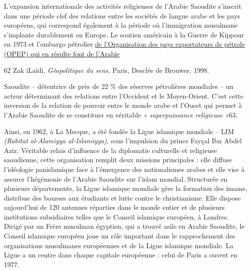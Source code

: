 L'expansion internationale des activités religieuses de l'Arabie
Saoudite s'inscrit dans une période clef des relations entre les
sociétés de langue arabe et les pays européens, qui correspond également
à la période où l'immigration musulmane s'implante durablement en
Europe. Le soutien américain à la Guerre de Kippour en 1973 et l'embargo
pétrolier \underline{de l'Organisation des pays exportateurs de pétrole
(OPEP) qui en résulte font de l'Arabie}

62 Zak iLaïdi, \emph{Géopolitique du sens,} Paris, Desclée de Brouwer,
1998.



Saoudite -- détentrice de près de 22 \% des réserves pétrolières
mondiales -- un acteur déterminant des relations entre l'Occident et le
Moyen-Orient. C'est cette inversion de la relation de pouvoir entre le
monde arabe et l'Ouest qui permet à l'Arabie Saoudite de se constituer
en véritable \emph{« superpuissance religieuse »}63\emph{.}

Ainsi, en 1962, à La Mecque, a été fondée la Ligue islamique mondiale --
LIM \emph{(Rabitat al-Alamiyya al-Islamiyya)}, sous l'impulsion du
prince Fayçal Ibn Abdel Aziz. Véritable relais d'influence de la
diplomatie culturelle et religieuse saoudienne, cette organisation
remplit deux missions principales : elle diffuse l'idéologie
panislamique face à l'émergence des nationalismes arabes et elle vise à
assurer l'hégémonie de l'Arabie Saoudite sur l'islam mondial. Structurée
en plusieurs départements, la Ligue islamique mondiale gère la formation
des imams, distribue des bourses aux étudiants et lutte contre le
christianisme. Elle dispose aujourd'hui de 120 antennes réparties dans
le monde entier et de plusieurs institutions subsidiaires telles que le
Conseil islamique européen, à Londres. Dirigé par un Frère musulman
égyptien, qui a trouvé asile en Arabie Saoudite, le Conseil islamique
européen joue un rôle important dans le rapprochement des organisations
musulmanes européennes et de la Ligue islamique mondiale. La Ligue a un
centre dans chaque capitale européenne : celui de Paris a ouvert en
1977.


